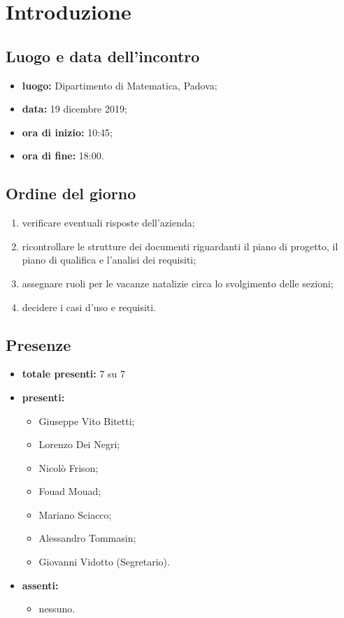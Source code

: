 \section*{Introduzione}

\subsection*{Luogo e data dell'incontro}
	\begin{itemize}
		\item \textbf{luogo:} Dipartimento di Matematica, Padova;
		\item \textbf{data:} 19 dicembre 2019;
		\item \textbf{ora di inizio:} 10:45;
		\item \textbf{ora di fine:} 18:00.
	\end{itemize}

\subsection*{Ordine del giorno}
	\begin{enumerate}
		\item verificare eventuali risposte dell'azienda;
		\item ricontrollare le strutture dei documenti riguardanti il piano di progetto, il piano di qualifica e l'analisi dei requisiti;
		\item assegnare ruoli per le vacanze natalizie circa lo svolgimento delle sezioni;
		\item decidere i casi d'uso e requisiti.
	\end{enumerate}

\subsection*{Presenze}
	\begin{itemize}
		\item \textbf{totale presenti:} 7 su 7
		\item \textbf{presenti:}
			\begin{itemize}			
				\item Giuseppe Vito Bitetti;
				\item Lorenzo Dei Negri;
				\item Nicolò Frison;
				\item Fouad Mouad;
				\item Mariano Sciacco;
				\item Alessandro Tommasin;
				\item Giovanni Vidotto (Segretario).
			\end{itemize}
		\item \textbf{assenti:} 
			\begin{itemize}	
				\item nessuno.
			\end{itemize}
	\end{itemize}


